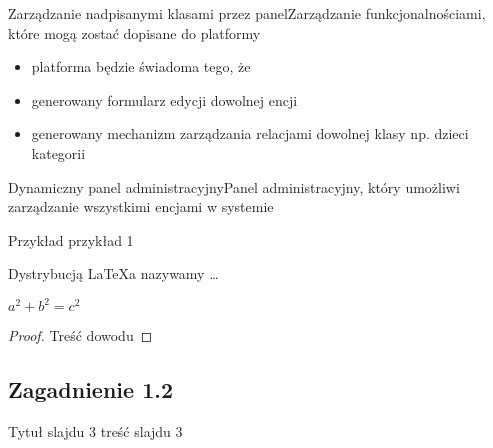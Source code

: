 \documentclass[polish,xcolor=table,9pt,aspectratio=1610,hyperref={pdfpagemode=FullScreen}]{beamer}
\begin{document}
\begin{frame}{Zarządzanie nadpisanymi klasami przez panel}{Zarządzanie funkcjonalnościami, które mogą zostać dopisane do platformy}
	\begin{itemize}
		\begin{exampleblock}{Przykład}
			Programista decyduje się na 
		\end{exampleblock}
		\item<1-> platforma będzie świadoma tego, że 
		\item<2-> generowany formularz edycji dowolnej encji
		\item<3-> generowany mechanizm zarządzania relacjami dowolnej klasy np. dzieci kategorii
	\end{itemize}
\end{frame}
\begin{frame}{Dynamiczny panel administracyjny}{Panel administracyjny, który umożliwi zarządzanie wszystkimi encjami w systemie}
\begin{exampleblock}{Przykład}
przykład 1
\end{exampleblock}
\begin{definition}
Dystrybucją \LaTeX a nazywamy \ldots
\end{definition}
\begin{theorem}[Pitagorasa]
$a^2+b^2=c^2$
\end{theorem}
\pause %
\begin{proof}
Treść dowodu
\end{proof}
\end{frame}

\subsection{Zagadnienie 1.2}

\begin{frame}{Tytuł slajdu 3}
treść slajdu 3
\end{frame}
\end{document}
